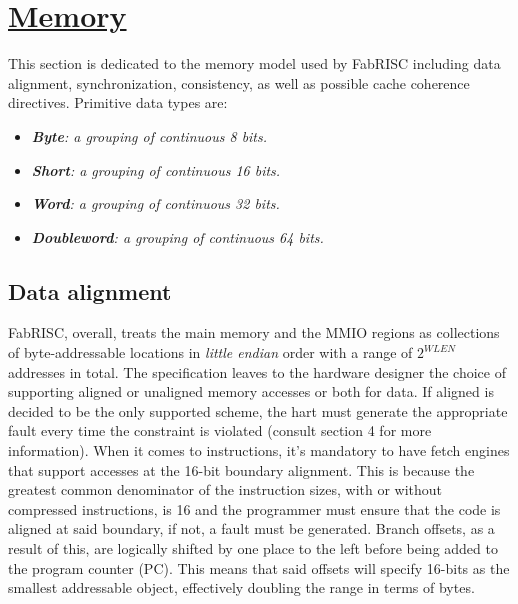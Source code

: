 \documentclass{article}
\begin{document}
    \clearpage


    \section[Memory]{\LARGE\underline{Memory}} %

        This section is dedicated to the memory model used by FabRISC including data alignment, synchronization, consistency, as well as possible cache coherence directives. Primitive data types are:

        \begin{itemize}

            \item \textit{\textbf{Byte}: a grouping of continuous 8 bits.}
            \item \textit{\textbf{Short}: a grouping of continuous 16 bits.}
            \item \textit{\textbf{Word}: a grouping of continuous 32 bits.}
            \item \textit{\textbf{Doubleword}: a grouping of continuous 64 bits.}

        \end{itemize}

        \subsection[Data alignment]{Data alignment}

            FabRISC, overall, treats the main memory and the MMIO regions as collections of byte-addressable locations in \textit{little endian} order with a range of \(2^{WLEN}\) addresses in total. The specification leaves to the hardware designer the choice of supporting aligned or unaligned memory accesses or both for data. If aligned is decided to be the only supported scheme, the hart must generate the appropriate fault every time the constraint is violated (consult section 4 for more information). When it comes to instructions, it's mandatory to have fetch engines that support accesses at the 16-bit boundary alignment. This is because the greatest common denominator of the instruction sizes, with or without compressed instructions, is 16 and the programmer must ensure that the code is aligned at said boundary, if not, a fault must be generated. Branch offsets, as a result of this, are logically shifted by one place to the left before being added to the program counter (PC). This means that said offsets will specify 16-bits as the smallest addressable object, effectively doubling the range in terms of bytes.
\end{document}
